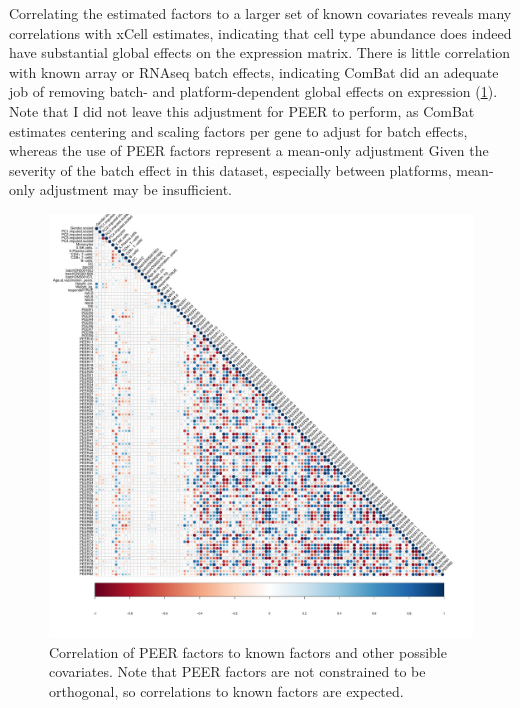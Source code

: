 Correlating the estimated factors to a larger set of known covariates reveals many correlations with xCell estimates, indicating that cell type abundance does indeed have substantial global effects on the expression matrix.
There is little correlation with known array or \gls{RNAseq} batch effects, indicating ComBat did an adequate job of removing batch- and platform-dependent global effects on expression (\cref{fig:hird_peer_corMatrix_v2_mega}).
Note that I did not leave this adjustment for PEER to perform, as ComBat estimates centering and scaling factors per gene to adjust for batch effects, whereas the use of PEER factors represent a mean-only adjustment
Given the severity of the batch effect in this dataset, especially between platforms, mean-only adjustment may be insufficient\autocite{zhang2018AlternativeEmpiricalBayes}.

\begin{figure}
    \centering
    \includegraphics[width=1.0\textwidth,page=1]{mainmatter/figures/chapter_03/peer_mega/peer.factor_cor_matrix.v2.pdf}
    \caption{Correlation of PEER factors to known factors and other possible covariates. Note that PEER factors are not constrained to be orthogonal, so correlations to known factors are expected.}
    \label{fig:hird_peer_corMatrix_v2_mega}
\end{figure}

